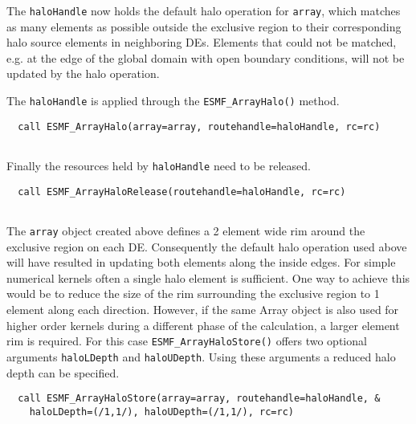    The {\tt haloHandle} now holds the default halo operation for {\tt array}, 
   which matches as many elements as possible outside the exclusive region to 
   their corresponding halo source elements in neighboring DEs. Elements that
   could not be matched, e.g. at the edge of the global domain with open
   boundary conditions, will not be updated by the halo operation.
  
   The {\tt haloHandle} is applied through the {\tt ESMF\_ArrayHalo()} method. 

 \begin{verbatim}
  call ESMF_ArrayHalo(array=array, routehandle=haloHandle, rc=rc)
 
\end{verbatim}
 

   Finally the resources held by {\tt haloHandle} need to be released. 

 \begin{verbatim}
  call ESMF_ArrayHaloRelease(routehandle=haloHandle, rc=rc)
 
\end{verbatim}
 

   The {\tt array} object created above defines a 2 element wide rim around the
   exclusive region on each DE. Consequently the default halo operation used
   above will have resulted in updating both elements along the inside edges.
   For simple numerical kernels often a single halo element is 
   sufficient. One way to achieve this would be to reduce the size of the 
   rim surrounding the exclusive region to 1 element along each direction. 
   However, if the same Array object is also used for higher order kernels
   during a different phase of the calculation, a larger element rim is
   required. For this case {\tt ESMF\_ArrayHaloStore()} offers two optional
   arguments {\tt haloLDepth} and {\tt haloUDepth}. Using these arguments a
   reduced halo depth can be specified. 

 \begin{verbatim}
  call ESMF_ArrayHaloStore(array=array, routehandle=haloHandle, &
    haloLDepth=(/1,1/), haloUDepth=(/1,1/), rc=rc)
 
\end{verbatim}
 
